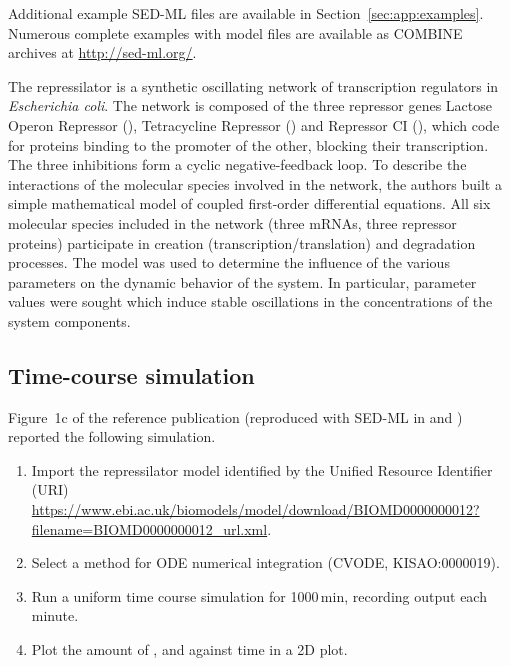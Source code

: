 Additional example SED-ML files are available in Section~\ref{sec:app:examples}. Numerous complete examples with model files are available as COMBINE archives at \url{http://sed-ml.org/}.

The repressilator is a synthetic oscillating network of transcription regulators in \textit{Escherichia coli}. The network is composed of the three repressor genes Lactose Operon Repressor (), Tetracycline Repressor () and Repressor CI (), which code for proteins binding to the promoter of the other, blocking their transcription. The three inhibitions form a cyclic negative-feedback loop. To describe the interactions of the molecular species involved in the network, the authors built a simple mathematical model of coupled first-order differential equations. All six molecular species included in the network (three mRNAs, three repressor proteins) participate in creation (transcription/translation) and degradation processes. The model was used to determine the influence of the various parameters on the dynamic behavior of the system. In particular, parameter values were sought which induce stable oscillations in the concentrations of the system components.

\subsection{Time-course simulation}
\label{sec:timecourse}
Figure~1c of the reference publication \citep{Elowitz:2000} (reproduced with SED-ML in  and ) reported the following simulation. 

\begin{enumerate}
 	\item{Import the repressilator model identified by the Unified Resource Identifier (URI) \citep{Berners-Lee:2005}\\ 	\url{https://www.ebi.ac.uk/biomodels/model/download/BIOMD0000000012?filename=BIOMD0000000012_url.xml}.}
 	\item {Select a method for ODE numerical integration (CVODE, KISAO:0000019).}
 	\item{Run a uniform time course simulation for 1000\,min, recording output each minute.}
 	\item{Plot the amount of ,  and  against time in a 2D plot.}
 \end{enumerate}

